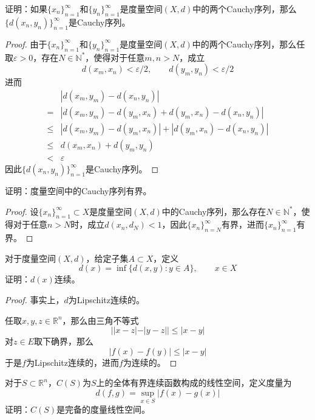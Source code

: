 \documentclass[lang = cn, scheme = chinese, 10pt]{elegantbook}
\newcommand{\N}{\mathbb{N}}  %
\newcommand{\R}{\mathbb{R}}  %
\newcommand{\sub}{\subset}   %
\begin{document}
\begin{proposition}
	证明：如果$\{x_n\}_{n=1}^{\infty}$和$\{y_n\}_{n=1}^{\infty}$是度量空间$( X,d )$中的两个Cauchy序列，那么$\{d(x_n,y_n)\}_{n=1}^{\infty}$是Cauchy序列。
\end{proposition}

\begin{proof}
	由于$\{x_n\}_{n=1}^{\infty}$和$\{y_n\}_{n=1}^{\infty}$是度量空间$( X,d )$中的两个Cauchy序列，那么任取$\varepsilon>0$，存在$N\in\N^*$，使得对于任意$m,n > N$，成立
	$$
	d(x_m,x_n)<\varepsilon/2,\qquad d(y_m,y_n)<\varepsilon/2
	$$
	进而
	\nonumber\begin{align}
		&|d(x_m,y_m)-d(x_n,y_n)|\\
		= & |d(x_m,y_m)-d(y_m,x_n)+d(y_m,x_n)-d(x_n,y_n)|\\
		\le & |d(x_m,y_m)-d(y_m,x_n)|+|d(y_m,x_n)-d(x_n,y_n)|\\
		\le & d(x_m,x_n)+d(y_m,y_n)\\
		<& \varepsilon
	\end{align}
	因此$\{d(x_n,y_n)\}_{n=1}^{\infty}$是Cauchy序列。
\end{proof}

\begin{proposition}
	证明：度量空间中的Cauchy序列有界。
\end{proposition}

\begin{proof}
	设$\{ x_n \}_{n=1}^{\infty}\sub X$是度量空间$( X,d )$中的Cauchy序列，那么存在$N\in\N^*$，使得对于任意$n>N$时，成立$d(x_n,d_N)<1$，因此$\{ x_n \}_{n=N}^{\infty}$有界，进而$\{ x_n \}_{n=1}^{\infty}$有界。
\end{proof}

\begin{proposition}
	对于度量空间$(X,d)$，给定子集$A\sub X$，定义
	$$
	d(x)=\inf\{ d(x,y):y\in A \},\qquad x\in X
	$$
	证明：$d(x)$连续。
\end{proposition}

\begin{proof}
	事实上，$d$为Lipschitz连续的。
	
	任取$x,y,z\in\R^n$，那么由三角不等式
	$$
	||x-z|-|y-z||\le |x-y|
	$$
	对$z\in E$取下确界，那么
	$$
	|f(x)-f(y)|\le |x-y|
	$$
	于是$f$为Lipschitz连续的，进而$f$为连续的。
\end{proof}

\begin{proposition}
	对于$S\sub\R^n$，$C(S)$为$S$上的全体有界连续函数构成的线性空间，定义度量为
	$$
	d(f,g)=\sup_{x\in S}|f(x)-g(x)|
	$$
	证明：$C(S)$是完备的度量线性空间。
\end{proposition}
\end{document}
